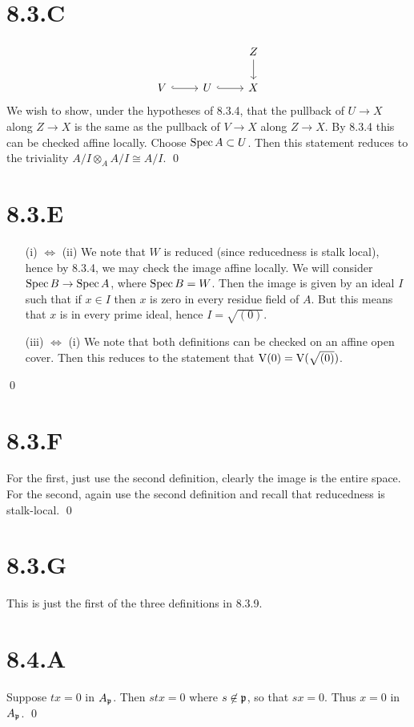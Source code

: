 \documentclass{article}
\begin{document}
\section{8.3.C}
\[\begin{tikzcd}
          &   & Z \\
        V & U & X
        \arrow[from=1-3, to=2-3]
        \arrow[hook, from=2-2, to=2-3]
        \arrow[hook, from=2-1, to=2-2]
    \end{tikzcd}\]
We wish to show, under the hypotheses of 8.3.4, that the pullback of
$U \to X$ along $Z\to X$ is the same as the
pullback of $V \to X$ along $Z \to X$. By 8.3.4
this can be checked affine locally. Choose $\operatorname{Spec} A \subset U$. Then this
statement reduces to the triviality $A/I \otimes_A A/I \cong A/I$. \qed

\section{8.3.E}
\begin{itemize}
    \item[(i) $\iff$ (ii)] We note that $W$ is reduced (since reducedness is stalk
        local), hence by 8.3.4, we may check the image affine locally. We will consider
        $\operatorname{Spec} B \to \operatorname{Spec} A$, where $\operatorname{Spec} B=W$. Then the image is given
        by an ideal $I$ such that if $x \in I$ then
        $x$ is zero in every residue field of
        $A$. But this means that $x$ is in every
        prime ideal, hence $I=\sqrt{(0)}$.
    \item[(iii) $\iff$ (i)] We note that both definitions can be checked on an affine open cover. Then this
        reduces to the statement that $\operatorname{V}(0)=\operatorname{V}(\sqrt{(0)})$.
\end{itemize}
\qed

\section{8.3.F}
For the first, just use the second definition, clearly the image is the entire
space. For the second, again use the second definition and recall that
reducedness is stalk-local. \qed

\section{8.3.G}
This is just the first of the three definitions in 8.3.9.

\section{8.4.A}
Suppose $tx=0$ in $A_{\mathfrak{p}}$. Then
$stx=0$ where $s \not \in \mathfrak{p}$, so that
$sx=0$. Thus $x=0$ in
$A_{\mathfrak{p}}$. \qed
\end{document}
